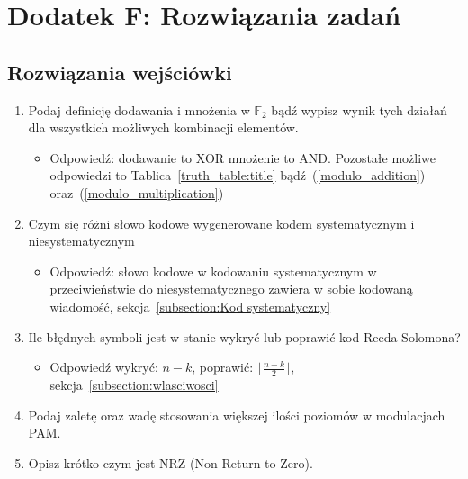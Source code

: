 \setcounter{secnumdepth}{0}
\section*{Dodatek F: Rozwiązania zadań}

\subsection*{Rozwiązania wejściówki}
\begin{enumerate}
    \item Podaj definicję dodawania i mnożenia w $\mathbb{F}_2$ bądź wypisz wynik tych
    działań dla wszystkich możliwych kombinacji elementów.
    \begin{itemize}
        \item Odpowiedź: dodawanie to XOR mnożenie to AND. Pozostałe możliwe odpowiedzi to Tablica~\ref{truth_table:title} bądź~(\ref{modulo_addition})
        oraz~(\ref{modulo_multiplication})
    \end{itemize}
    \item Czym się różni słowo kodowe wygenerowane kodem systematycznym i niesystematycznym
    \begin{itemize}
        \item Odpowiedź: słowo kodowe w kodowaniu systematycznym w przeciwieństwie do niesystematycznego zawiera w sobie kodowaną wiadomość, sekcja~\ref{subsection:Kod systematyczny}
    \end{itemize}
    \item Ile błędnych symboli jest w stanie wykryć lub poprawić kod Reeda-Solomona?
    \begin{itemize}
        \item Odpowiedź wykryć: $n-k$, poprawić: $\lfloor \frac{n-k}{2} \rfloor$, sekcja~\ref{subsection:wlasciwosci}
    \end{itemize}
    \item Podaj zaletę oraz wadę stosowania większej ilości poziomów w modulacjach PAM.
    \item Opisz krótko czym jest NRZ (Non-Return-to-Zero).
\end{enumerate}

